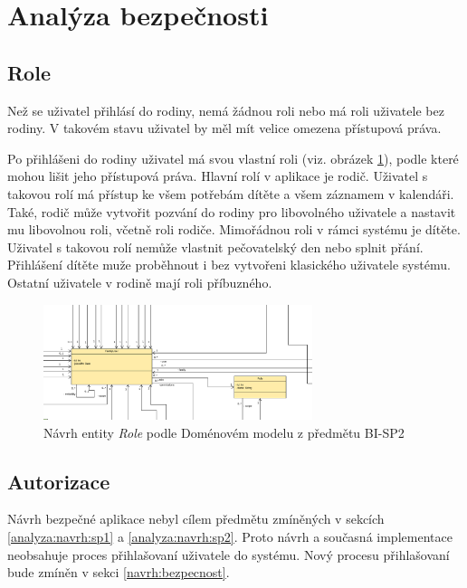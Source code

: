 \section{Analýza bezpečnosti}
    
    \subsection{Role}\label{analyza:bezpecnost:role}
    
        Než se uživatel přihlásí do rodiny, nemá žádnou roli nebo má roli uživatele bez rodiny. V takovém stavu uživatel by měl mít velice omezena přístupová práva. 
        
        Po přihlášeni do rodiny uživatel má svou vlastní roli (viz. obrázek \ref{image:Role1}), podle které mohou lišit jeho přístupová práva. Hlavní rolí v aplikace je rodič. Uživatel s takovou rolí má přístup ke všem potřebám dítěte a všem záznamem v kalendáři. Také, rodič může vytvořit pozvání do rodiny pro libovolného uživatele a nastavit mu libovolnou roli, včetně roli rodiče. Mimořádnou roli v rámci systému je dítěte. Uživatel s takovou rolí nemůže vlastnit pečovatelský den nebo splnit přání. Přihlášení dítěte muže proběhnout i bez vytvořeni klasického uživatele systému. Ostatní uživatele v rodině mají roli příbuzného.
        \begin{figure}\centering
	        \includegraphics[width=0.7\textwidth]{pdfs/Role1}
	        \caption[Návrh \textit{Role}]{Návrh entity \textit{Role} podle Doménovém modelu z předmětu BI-SP2}\label{image:Role1}
        \end{figure}
    
    \subsection{Autorizace}
        Návrh bezpečné aplikace nebyl cílem předmětu zmíněných v sekcích \ref{analyza:navrh:sp1} a \ref{analyza:navrh:sp2}. Proto návrh a současná implementace neobsahuje proces přihlašovaní uživatele do systému. Nový procesu přihlašovaní bude zmíněn v sekci \ref{navrh:bezpecnost}.
        
